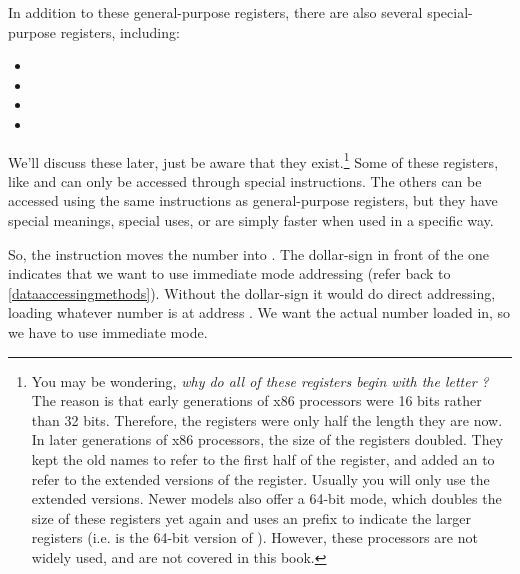 In addition to these general-purpose registers,
there are also several special-purpose registers, including:

\begin{itemize}\item {\ebpRegIdx} 
\item {\espRegIdx} 
\item {\eipRegIdx} 
\item {\eflagsRegIdx} 
\end{itemize}

We'll discuss these later, just be aware that they 
exist.\footnote{You may be wondering, \emph{why do all of these
registers begin with the letter ?}  The
reason is that early generations of x86 processors were 16 bits 
rather than 32 bits.
Therefore, the registers were only half the length
they are now.  In later generations of x86 processors, the size of the 
registers doubled. They kept
the old names to refer to the first half of the register, and added an
 to refer to the extended versions of the register.
Usually you will only use the extended versions.  Newer models also
offer a 64-bit mode, which doubles the size of these registers yet again
and uses an  prefix to indicate the larger registers (i.e.
{\raxReg} is the 64-bit version of {\eaxReg}).  However, these processors are not 
widely used, and are not covered in this book.
}  Some of these registers, like {\eipRegIdx} and {\eflagsRegIdx} can
only be accessed through special instructions.  The others can be accessed
using the same instructions as general-purpose registers, but they have 
special meanings, special uses, or are simply faster when used in a specific
way.

So, the  instruction moves the number 
 into \icode{{\eaxBare}}.  The 
dollar-sign in front of the one indicates that we want to use 
immediate mode addressing (refer back to \autoref{dataaccessingmethods}).  Without the dollar-sign it would do direct addressing,
loading whatever number is at address .  We want the
actual number  loaded in, so we have to use immediate
mode.  


